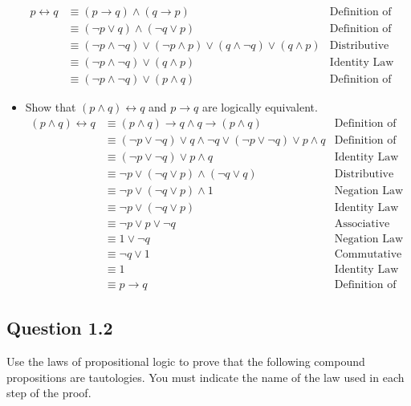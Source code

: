 \documentclass{article}
\begin{document}
\begin{itemize}
    \begin{align*}
        p \leftrightarrow q &\equiv (p \rightarrow q) \land (q \rightarrow p) & \text{Definition of biconditional}\\
        &\equiv (\neg p \lor q) \land (\neg q \lor p) & \text{Definition of implication}\\
        &\equiv (\neg p \land \neg q) \lor (\neg p \land p) \lor (q \land \neg q) \lor (q \land p) & \text{Distributive Law}\\
        &\equiv (\neg p \land \neg q) \lor (q \land p) & \text{Identity Law}\\
        &\equiv (\lnot p \land \lnot q) \lor (p \land q) & \text{Definition of negation}
    \end{align*}
    \item[] Show that $(p \land q) \leftrightarrow q$ and $p \rightarrow q$ are logically equivalent.
    \begin{align*}
        (p \land q) \leftrightarrow q &\equiv (p \land q) \rightarrow q \land q \rightarrow (p \land q) & \text{Definition of biconditional}\\
        &\equiv (\neg p \lor \neg q) \lor q \land \neg q \lor (\neg p \lor \neg q) \lor p \land q & \text{Definition of implication}\\
        &\equiv (\neg p \lor \neg q) \lor p \land q & \text{Identity Law}\\
        &\equiv \neg p \lor (\neg q \lor p) \land (\neg q \lor q) & \text{Distributive Law}\\
        &\equiv \neg p \lor (\neg q \lor p) \land 1 & \text{Negation Law}\\
        &\equiv \neg p \lor (\neg q \lor p) & \text{Identity Law}\\
        &\equiv \neg p \lor p \lor \neg q & \text{Associative Law}\\
        &\equiv 1 \lor \neg q & \text{Negation Law}\\
        &\equiv \neg q \lor 1 & \text{Commutative Law}\\
        &\equiv 1 & \text{Identity Law}\\
        &\equiv p \rightarrow q & \text{Definition of implication}
    \end{align*}

\end{itemize}
\newpage
\subsection{\textbf{Question 1.2}}
Use the laws of propositional logic to prove that the following compound propositions are tautologies. You must indicate the name of the law used in each step of the proof.
\end{document}

